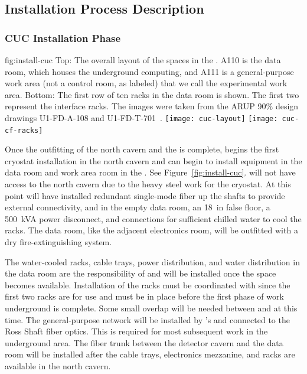 \subsection{Installation Process Description}
\label{sec:fdsp-tc-inst-proc}


\subsubsection{CUC Installation Phase}
\label{sec:fdsp-tc-inst-CUC}

\begin{dunefigure}{fig:install-cuc}
  {Top: The overall layout of the  spaces in the . A110 is the  data room, which houses the underground computing, and A111 is a general-purpose work area (not a control room, as labeled) that we call the experimental work area. Bottom: The first row of ten racks in the data room is shown. The first two represent the  interface racks. The images were taken from the ARUP 90\% design drawings U1-FD-A-108 and U1-FD-T-701~\cite{bib:docdb14242}.}
\texttt{[image: cuc-layout]}
\vspace{-2pt}
\texttt{[image: cuc-cf-racks]}
\end{dunefigure}

 
Once the   outfitting of the north cavern and the  is complete,   begins the first cryostat installation in the north cavern and  can begin to install equipment in the data room and work area room in the . See Figure~\ref{fig:install-cuc}.   will not have access to the north cavern due to the heavy steel work for the cryostat. 
At this point    will have installed redundant single-mode fiber up the shafts to provide external connectivity, and in the empty data room,  an \SI{18}{in} false floor, a \SI{500}{kVA} power disconnect, and connections for sufficient chilled water to cool the racks. The data room, like the adjacent  electronics room, will be outfitted with a dry fire-extinguishing system. 
 

The water-cooled racks, cable trays, power distribution, and water distribution in the data room are the responsibility of  and will be installed once the space becomes available.  
Installation of the racks must be coordinated with  
since the first two racks are for  use and must be in place before the first phase of work underground is complete. 
Some small overlap will be needed between  and  at this time. The general-purpose network will be installed by 's  and connected to the Ross Shaft fiber optics. 
This is required for most subsequent work in the underground area.
The  fiber trunk between the detector cavern and the  data room will be installed after the cable trays, electronics mezzanine, and racks are available in the north cavern.


